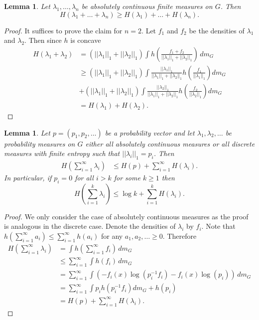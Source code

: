 \documentclass[10pt, english,oneside,reqno]{amsart}
\theoremstyle{plain}
\newtheorem{lemma}[theorem]{Lemma}
\theoremstyle{remark}
\numberwithin{equation}{section}
\numberwithin{figure}{section}
\newcommand{\Haarof}[1]{m_{#1}}
\begin{document}
\begin{lemma}\label{EntSum1}
    Let $\lambda_1, \ldots , \lambda_n$ be absolutely continuous finite measures on $G$. Then $$H(\lambda_1 + \ldots + \lambda_n) \geq H(\lambda_1) + \ldots + H(\lambda_n).$$
\end{lemma}

\begin{proof}
    It suffices to prove the claim for $n = 2$. Let $f_1$ and $f_2$ be the densities of $\lambda_1$ and $\lambda_2$. Then since $h$ is concave 
    \begin{align*}
        H(\lambda_1 + \lambda_2) &= (||\lambda_1||_1 + ||\lambda_2||_1) \int h\left( \frac{f_1 + f_2}{||\lambda_1||_1 + ||\lambda_2||_1}   \right) \, d\Haarof{G} \\
        &\geq (||\lambda_1||_1 + ||\lambda_2||_1) \int \frac{||\lambda_1||_1}{||\lambda_1||_1 + ||\lambda_2||_1}h\left( \frac{f_1}{||\lambda_1||_1} \right) d\Haarof{G} \\ &+ (||\lambda_1||_1 + ||\lambda_2||_1) \int \frac{||\lambda_2||_1}{||\lambda_1||_1 + ||\lambda_2||_1}h\left( \frac{f_2}{||\lambda_2||_1} \right) d\Haarof{G} \\
        &= H(\lambda_1) + H(\lambda_2).
    \end{align*}
\end{proof}

\begin{lemma}\label{EntSum2}
    Let $p = (p_1,p_2,\ldots)$ be a probability vector and let $\lambda_1, \lambda_2 , \ldots $ be probability measures on $G$ either all absolutely continuous measures or all discrete measures with finite entropy such that $||\lambda_i||_1 = p_i$. Then 
    \begin{align*}
        H\left( \sum_{i = 1}^{\infty}  \lambda_i \right) &\leq  H(p) + \sum_{i = 1}^{\infty}  H(\lambda_i).
    \end{align*} In particular, if $p_i = 0$ for all $i > k$ for some $k \geq 1$ then $$H\left( \sum_{i = 1}^k \lambda_i \right) \leq  \log k +  \sum_{i = 1}^k  H(\lambda_i).$$
\end{lemma}

\begin{proof}
    We only consider the case of absolutely continuous measures as the proof is analogous in the discrete case. Denote the densities of $\lambda_i$ by $f_i$. Note that $h(\sum_{i = 1}^{\infty} a_i) \leq \sum_{i = 1}^{\infty} h(a_i)$ for any $a_1, a_2 ,\ldots \geq 0$. Therefore 
    \begin{align*}
        H\left( \sum_{i = 1}^{\infty}  \lambda_i \right) &= \int h\left( \sum_{i = 1}^{\infty} f_i \right) \, d\Haarof{G} \\
        &\leq \sum_{i = 1}^\infty \int h(f_i) \, d\Haarof{G} \\
        &= \sum_{i = 1}^\infty \int (-f_i(x)\log(p_{i}^{-1}f_i) -f_i(x)\log(p_i)) \, d\Haarof{G} \\
        &=  \sum_{i = 1}^\infty \int p_i h(p_{i}^{-1}f_i) d\Haarof{G} + h(p_i) \\
        &= H(p) + \sum_{i = 1}^\infty H(\lambda_i). 
    \end{align*} 
\end{proof}
\end{document}

